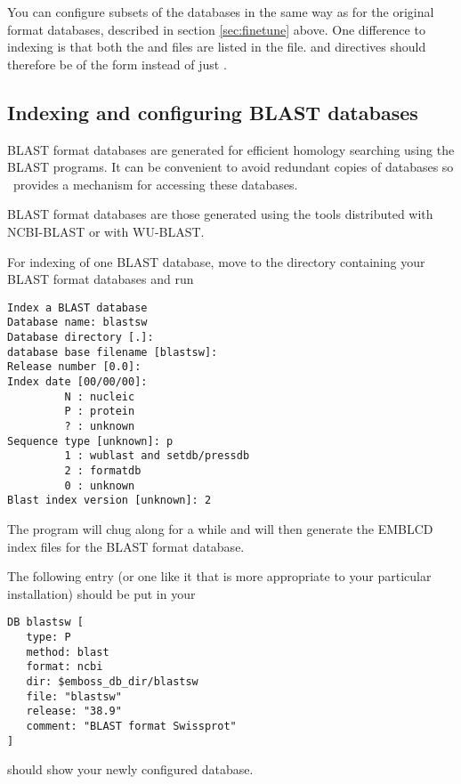 \documentclass{report}
\begin{document}
You can configure subsets of the databases in the same way as for the original format databases, described in section \ref{sec:finetune} above. One difference to  indexing is that both the  and  files are listed in the  file.  and  directives should therefore be of the form  instead of just .

\subsection{Indexing and configuring BLAST databases}
BLAST format databases are generated for efficient homology searching using the BLAST programs. It can be convenient to avoid redundant copies of databases so \EMBOSS\ provides a mechanism for accessing these databases.

BLAST format databases are those generated using the tools distributed with NCBI-BLAST or with WU-BLAST. \begin{comment}At present \EMBOSS\ will only index BLAST databases created from FASTA format input files with one of the recognised header formats.
More information on the relevant formats can be found in subsection \ref{subsec:fasta} below.\end{comment}
For indexing of one BLAST database, move to the directory containing your BLAST format databases and run 
\begin{verbatim}
Index a BLAST database
Database name: blastsw
Database directory [.]: 
database base filename [blastsw]: 
Release number [0.0]: 
Index date [00/00/00]: 
         N : nucleic
         P : protein
         ? : unknown
Sequence type [unknown]: p
         1 : wublast and setdb/pressdb
         2 : formatdb
         0 : unknown
Blast index version [unknown]: 2

\end{verbatim}
The program will chug along for a while and will then generate the EMBLCD index files for the BLAST format database.

The following entry (or one like it that is more appropriate to your particular installation) should be put in your 
\begin{verbatim}
DB blastsw [
   type: P
   method: blast
   format: ncbi
   dir: $emboss_db_dir/blastsw
   file: "blastsw"
   release: "38.9"
   comment: "BLAST format Swissprot"
]
\end{verbatim}
 should show your newly configured database.
\end{document}
